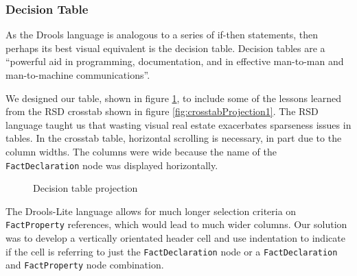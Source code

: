 \subsubsection{Decision Table}

As the Drools language is analogous to a series of if-then statements, then perhaps its best visual equivalent is the decision table.
Decision tables are a ``powerful aid in programming, documentation, and in effective man-to-man and man-to-machine communications''\cite{pooch1974translation}.

We designed our table, shown in figure \ref{fig:decisionTableProjection}, to include some of the lessons learned from the RSD crosstab shown in figure \ref{fig:crosstabProjection1}.
The RSD language taught us that wasting visual real estate exacerbates sparseness issues in tables.
In the crosstab table, horizontal scrolling is necessary, in part due to the column widths.
The columns were wide because the name of the \texttt{FactDeclaration} node was displayed horizontally.

\begin{figure}[h]
    \centering
    \caption{Decision table projection}
    \label{fig:decisionTableProjection}
\end{figure}

The Drools-Lite language allows for much longer selection criteria on \texttt{FactProperty} references, which would lead to much wider columns.
Our solution was to develop a vertically orientated header cell and use indentation to indicate if the cell is referring to just the \texttt{FactDeclaration} node or a \texttt{FactDeclaration} and \texttt{FactProperty} node combination.

